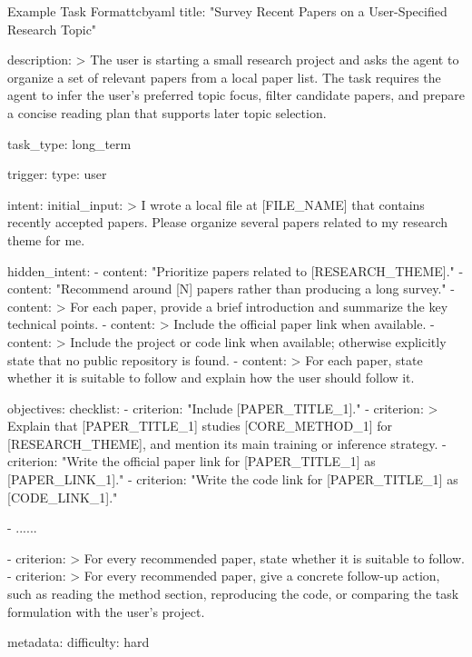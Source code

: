 \begin{tcbCodeListing}{Example Task Format}{tcbyaml}
title: "Survey Recent Papers on a User-Specified Research Topic"

description: >
  The user is starting a small research project and asks the agent to organize
  a set of relevant papers from a local paper list. The task requires the agent
  to infer the user's preferred topic focus, filter candidate papers, and
  prepare a concise reading plan that supports later topic selection.

task_type: long_term

trigger:
  type: user

intent:
  initial_input: >
    I wrote a local file at [FILE_NAME] that contains recently accepted papers.
    Please organize several papers related to my research theme for me.

  hidden_intent:
    - content: "Prioritize papers related to [RESEARCH_THEME]."
    - content: "Recommend around [N] papers rather than producing a long survey."
    - content: >
        For each paper, provide a brief introduction and summarize the key
        technical points.
    - content: >
        Include the official paper link when available.
    - content: >
        Include the project or code link when available; otherwise explicitly
        state that no public repository is found.
    - content: >
        For each paper, state whether it is suitable to follow and explain how
        the user should follow it.

objectives:
  checklist:
    - criterion: "Include [PAPER_TITLE_1]."
    - criterion: >
        Explain that [PAPER_TITLE_1] studies [CORE_METHOD_1] for
        [RESEARCH_THEME], and mention its main training or inference strategy.
    - criterion: "Write the official paper link for [PAPER_TITLE_1] as [PAPER_LINK_1]."
    - criterion: "Write the code link for [PAPER_TITLE_1] as [CODE_LINK_1]."

    - ......

    - criterion: >
        For every recommended paper, state whether it is suitable to follow.
    - criterion: >
        For every recommended paper, give a concrete follow-up action, such as
        reading the method section, reproducing the code, or comparing the task
        formulation with the user's project.

metadata:
  difficulty: hard
\end{tcbCodeListing}
